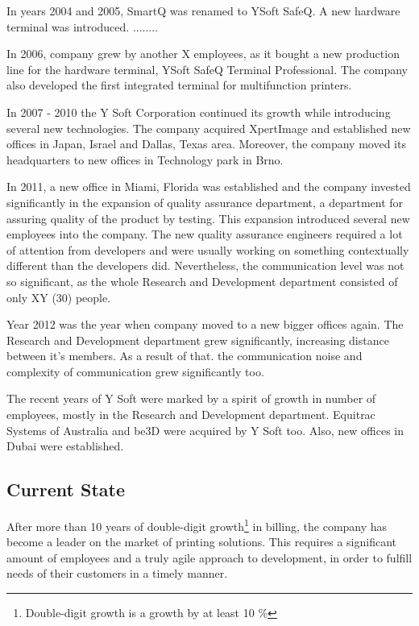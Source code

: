 \documentclass[11pt,singleside]{myfithesis2}
\begin{document}
In years 2004 and 2005, SmartQ was renamed to YSoft SafeQ. A new hardware terminal was introduced. ........

In 2006, company grew by another X employees, as it bought a new production line for the hardware terminal, YSoft SafeQ Terminal Professional. The company also developed the first integrated terminal for multifunction printers.

In 2007 - 2010 the Y Soft Corporation continued its growth while introducing several new technologies. The company acquired XpertImage and established new offices in Japan, Israel and Dallas, Texas area. Moreover, the company moved its headquarters to new offices in Technology park in Brno.

In 2011, a new office in Miami, Florida was established and the company invested significantly in the expansion of quality assurance department, a department for assuring quality of the product by testing. This expansion introduced several new employees into the company. The new quality assurance engineers required a lot of attention from developers and were usually working on something contextually different than the developers did. Nevertheless, the communication level was not so significant, as the whole Research and Development department consisted of only XY (30) people.

Year 2012 was the year when company moved to a new bigger offices again. The Research and Development department grew significantly, increasing distance between it's members. As a result of that. the communication noise and complexity of communication grew significantly too.

The recent years of Y Soft were marked by a spirit of growth in number of employees, mostly in the Research and Development department. Equitrac Systems of Australia and be3D were acquired by Y Soft too. Also, new offices in Dubai were established.

		\subsection{Current State}\label{currentState}
After more than 10 years of double-digit growth\footnote{Double-digit growth is a growth by at least 10 \%} in billing, the company has become a leader on the market of printing solutions. This requires a significant amount of employees and a truly agile approach to development, in order to fulfill needs of their customers in a timely manner. 
\end{document}
